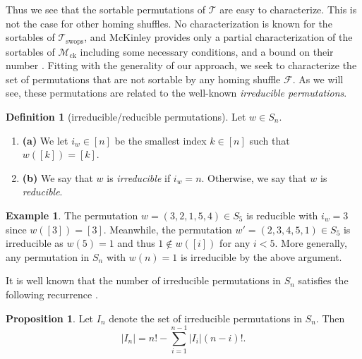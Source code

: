 \documentclass[final,nomarks]{dmtcs-episciences}
\theoremstyle{definition}
\newtheorem{prop}[thm]{Proposition}
\theoremstyle{definition}
\newtheorem{defn}[thm]{Definition}
\newtheorem{exmp}[thm]{Example}
\theoremstyle{remark}
\newcommand{\f}{\mathcal{F}} %
\newcommand{\T}{\mathcal{T}} %
\newcommand{\mck}{\mathcal{M}_{\text{ck}}} %
\newcommand{\Ts}{\mathcal{T}_{\text{swops}}} %
\newcommand{\tup}[1]{\left( #1 \right)}
\begin{document}
Thus we see that the sortable permutations of $ \T $ are easy to characterize.
This is not the case for other homing shuffles.
No characterization is known for the sortables of  $ \Ts $, and McKinley provides only a partial characterization of the sortables of $ \mck $ including some necessary conditions, and a bound on their number \cite{McK2015}.
Fitting with the generality of our approach, we seek to characterize the set of permutations that are not sortable by any homing shuffle $\f$. As we will see, these permutations are related to the well-known \emph{irreducible permutations}.
\begin{defn}[irreducible/reducible permutations]
    \label{irredPerms}
    Let $ w \in S_{n} $.
    \begin{enumerate}[]
        \item\textbf{(a)} We let $ i_{w} \in [n] $ be the smallest index $k \in [n]$ such that $w\tup{ [k] } = [k]$.
        \item\textbf{(b)} We say that $ w$ is \emph{irreducible} if $i_w = n$.
        Otherwise, we say that $ w $ is \emph{reducible}.
    \end{enumerate}
\end{defn}

\begin{exmp}
The permutation $w = \tup{3,2,1,5,4} \in S_5$ is reducible with $i_w = 3$ since $w([3])=[3]$. Meanwhile, the permutation $w' = \tup{2,3,4,5,1} \in S_5$ is irreducible as $w(5)=1$ and thus $1 \notin w([i])$ for any $i < 5$. More generally, any permutation in $S_n$ with $w(n)=1$ is irreducible by the above argument.
\end{exmp}

It is well known that the number of irreducible permutations in $ S_{n} $ satisfies the following recurrence \cite{KING2006}.

\begin{prop}
    \label{prop5}
    Let $ I_{n} $ denote the set of irreducible permutations in $ S_{n} $. Then
    \[
    |I_{n}| = n! - \sum_{i=1}^{n-1}|I_{i}|\tup{ n-i }!.
    \]
\end{prop}
\end{document}
